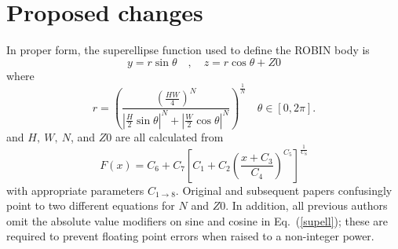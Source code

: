 \documentclass[journal]{new-aiaa}
\begin{document}
\section{Proposed changes}
In proper form, the superellipse function used to define the ROBIN body is
\begin{equation}
   y=r \sin \theta \quad , \quad z=r \cos \theta +Z0
\end{equation} 
where
\begin{equation}
  r=\left(\frac{\left(\frac{HW}{4}\right)^{N}}{|\frac{H}{2}\sin \theta|^{N}+|\frac{W}{2}\cos \theta|^{N}}\right)^{\frac{1}{N}} \quad \theta\in[0,2\pi].
\label{supell}
\end{equation}
and $H, \ W, \ N$, and $Z0$ are all calculated from
\begin{equation}
  F\!\left(x\right) = C_{6}+C_{7}\left[C_{1}+C_{2}\left(\frac{x+C_{3}}{C_{4}}\right)^{C_{5}}\right]^{\frac{1}{C_{8}}}
\end{equation}
with appropriate parameters $C_{1 \to 8}$.
Original \cite{nasa80051} and subsequent \cite{nasa87762} papers confusingly point to two different equations
for $N$ and $Z0$.
In addition, all previous authors omit the absolute value modifiers on sine and cosine in Eq.~(\ref{supell}); these are
required to prevent floating point errors when raised to a non-integer power.
\end{document}

